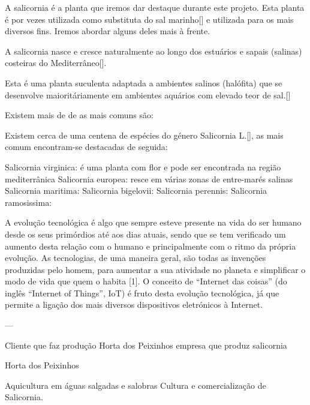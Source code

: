 A salicornia é a planta que iremos dar destaque durante este projeto. Esta planta é por vezes utilizada como substituta do sal marinho[] e utilizada para os mais diversos fins. Iremos abordar alguns deles mais à frente. 

A salicornia nasce e cresce naturalmente ao longo dos estuários e sapais (salinas) costeiras do Mediterrâneo[]. 





Esta é uma planta suculenta adaptada a ambientes salinos (halófita) que se desenvolve maioritáriamente em ambientes aquários com elevado teor de sal.[] 






Existem mais de  de  as mais comuns são: 






Existem cerca de uma centena de espécies do género Salicornia L.[], as mais comum encontram-se destacadas de seguida: 

Salicornia virginica: é uma planta com flor e pode ser encontrada na região mediterrânica
Salicornia europea: resce em várias zonas de entre-marés salinas 
Salicornia maritima: 
Salicornia bigelovii: 
Salicornia perennis: 
Salicornia ramosissima: 






A evolução tecnológica é algo que sempre esteve presente na vida do ser humano desde os seus primórdios até aos dias atuais, sendo que se tem verificado um aumento desta relação com o humano e principalmente com o ritmo da própria evolução.  As tecnologias, de uma maneira geral, são todas as invenções produzidas pelo homem, para aumentar a sua atividade no planeta e simplificar o modo de vida que quem o habita [1]. O conceito de “Internet das coisas” (do inglês “Internet of Things”, IoT) é fruto desta evolução tecnológica, já que permite a ligação dos mais diversos dispositivos eletrónicos à Internet. 








---


Cliente que faz produção 
Horta dos Peixinhos empresa que produz salicornia 

Horta dos Peixinhos

Aquicultura em águas salgadas e salobras
Cultura e comercialização de Salicornia.





